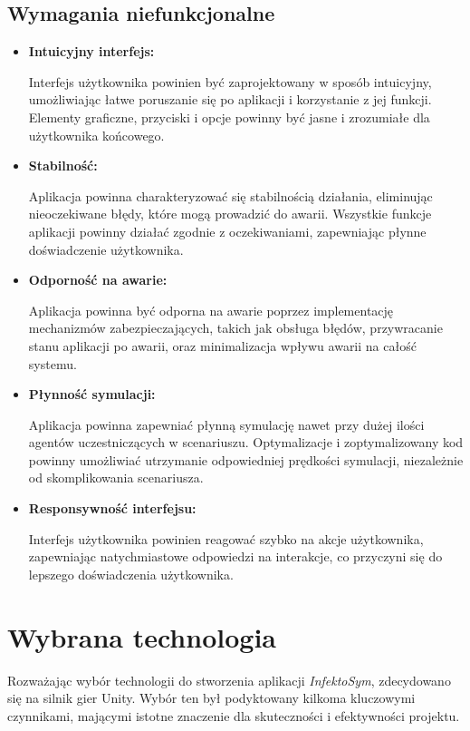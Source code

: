 \subsection{\textbf{Wymagania niefunkcjonalne}}
\begin{itemize}
	\item\textbf{  Intuicyjny interfejs:}
	
	Interfejs użytkownika powinien być zaprojektowany w sposób intuicyjny, umożliwiając łatwe poruszanie się po aplikacji i korzystanie z jej funkcji. Elementy graficzne, przyciski i opcje powinny być jasne i zrozumiałe dla użytkownika końcowego.
	\item\textbf{ Stabilność:}
	
	Aplikacja powinna charakteryzować się stabilnością działania, eliminując nieoczekiwane błędy, które mogą prowadzić do awarii. Wszystkie funkcje aplikacji powinny działać zgodnie z oczekiwaniami, zapewniając płynne doświadczenie użytkownika.
	\item\textbf{ Odporność na awarie:}
	
	Aplikacja powinna być odporna na awarie poprzez implementację mechanizmów zabezpieczających, takich jak obsługa błędów, przywracanie stanu aplikacji po awarii, oraz minimalizacja wpływu awarii na całość systemu.
	
	\item \textbf{Płynność symulacji:}
	
	Aplikacja powinna zapewniać płynną symulację nawet przy dużej ilości agentów uczestniczących w scenariuszu. Optymalizacje i zoptymalizowany kod powinny umożliwiać utrzymanie odpowiedniej prędkości symulacji, niezależnie od skomplikowania scenariusza.
	
	\item\textbf{ Responsywność interfejsu:}
	
	Interfejs użytkownika powinien reagować szybko na akcje użytkownika, zapewniając natychmiastowe odpowiedzi na interakcje, co przyczyni się do lepszego doświadczenia użytkownika.
\end{itemize}
\section{\textbf{Wybrana technologia}}

Rozważając wybór technologii do stworzenia aplikacji \textit{InfektoSym}, zdecydowano się na silnik gier Unity. Wybór ten był podyktowany kilkoma kluczowymi czynnikami, mającymi istotne znaczenie dla skuteczności i efektywności projektu.

